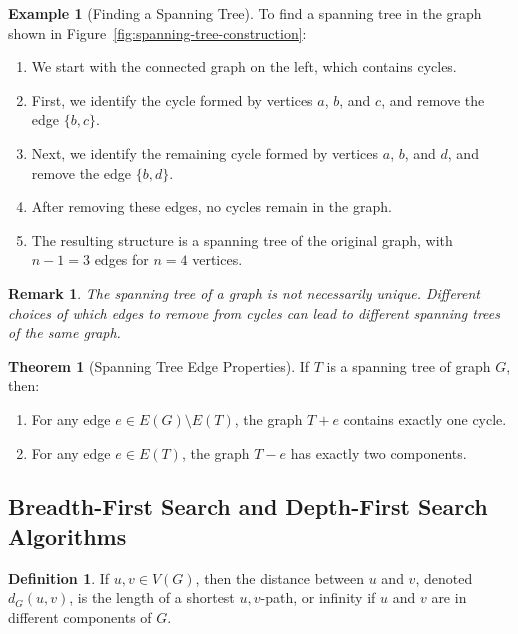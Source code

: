 \documentclass{article}
\newtheorem{remark}{Remark}
\theoremstyle{definition}
\newtheorem{example}{Example}
\newtheorem{theorem}{Theorem}
\newtheorem{definition}{Definition}
\begin{document}
\begin{example}[Finding a Spanning Tree]
To find a spanning tree in the graph shown in Figure~\ref{fig:spanning-tree-construction}:
\begin{enumerate}
    \item We start with the connected graph on the left, which contains cycles.
    \item First, we identify the cycle formed by vertices $a$, $b$, and $c$, and remove the edge $\{b,c\}$.
    \item Next, we identify the remaining cycle formed by vertices $a$, $b$, and $d$, and remove the edge $\{b,d\}$.
    \item After removing these edges, no cycles remain in the graph.
    \item The resulting structure is a spanning tree of the original graph, with $n-1 = 3$ edges for $n = 4$ vertices.
\end{enumerate}
\end{example}

\begin{remark}
The spanning tree of a graph is not necessarily unique. Different choices of which edges to remove from cycles can lead to different spanning trees of the same graph.
\end{remark}

\begin{theorem}[Spanning Tree Edge Properties]
If $T$ is a spanning tree of graph $G$, then:
\begin{enumerate}
    \item For any edge $e \in E(G) \setminus E(T)$, the graph $T + e$ contains exactly one cycle.
    \item For any edge $e \in E(T)$, the graph $T - e$ has exactly two components.
\end{enumerate}
\end{theorem}

\subsection{Breadth-First Search and Depth-First Search Algorithms}\label{subsec:bfs-dfs}

\begin{definition}
If $u, v \in V(G)$, then the distance between $u$ and $v$, denoted $d_G(u,v)$, is the length of a shortest $u,v$-path, or infinity if $u$ and $v$ are in different components of $G$.
\end{definition}
\end{document}
